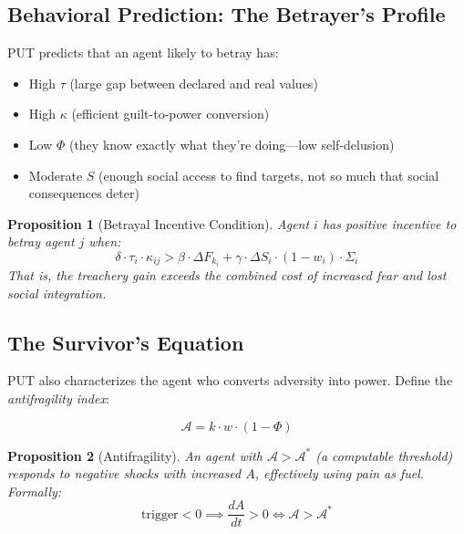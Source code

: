 \documentclass[12pt, a4paper]{article}
\newtheorem{proposition}{Proposition}[section]
\theoremstyle{remark}
\newcommand{\Fk}{F_k}
\newcommand{\ddt}[1]{\frac{d#1}{dt}}
\begin{document}
\subsection{Behavioral Prediction: The Betrayer's Profile}

PUT predicts that an agent likely to betray has:
\begin{itemize}[nosep]
    \item High $\tau$ (large gap between declared and real values)
    \item High $\kappa$ (efficient guilt-to-power conversion)
    \item Low $\Phi$ (they know exactly what they're doing---low self-delusion)
    \item Moderate $S$ (enough social access to find targets, not so much that
          social consequences deter)
\end{itemize}

\begin{proposition}[Betrayal Incentive Condition]
Agent $i$ has positive incentive to betray agent $j$ when:
\begin{equation}
    \delta \cdot \tau_i \cdot \kappa_{ij} > \beta \cdot \Delta \Fk_i + \gamma \cdot \Delta S_i \cdot (1 - w_i) \cdot \Sigma_i
\end{equation}
That is, the treachery gain exceeds the combined cost of increased fear
and lost social integration.
\end{proposition}

\subsection{The Survivor's Equation}

PUT also characterizes the agent who converts adversity into power.
Define the \emph{antifragility index}:

\begin{equation}
    \mathcal{A} = k \cdot w \cdot (1 - \Phi)
\end{equation}

\begin{proposition}[Antifragility]
An agent with $\mathcal{A} > \mathcal{A}^*$ (a computable threshold)
responds to negative shocks with \emph{increased} $A$, effectively
using pain as fuel. Formally:
\begin{equation}
    \text{trigger} < 0 \implies \ddt{A} > 0 \iff \mathcal{A} > \mathcal{A}^*
\end{equation}
\end{proposition}
\end{document}
